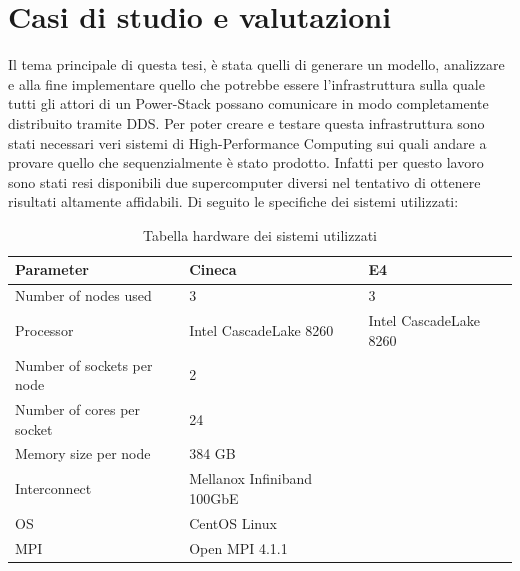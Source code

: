 \chapter{Casi di studio e valutazioni}
Il tema principale di questa tesi, è stata quelli di generare un modello, analizzare e alla fine implementare quello che potrebbe essere l'infrastruttura sulla quale tutti gli attori di un Power-Stack 
possano comunicare in modo completamente distribuito tramite DDS. Per poter creare e testare questa infrastruttura sono stati necessari veri sistemi di High-Performance Computing sui quali andare a provare quello che sequenzialmente è stato prodotto. Infatti per questo lavoro sono stati resi disponibili due supercomputer diversi nel tentativo di ottenere risultati altamente affidabili. Di seguito le specifiche dei sistemi utilizzati:

\begin{table}[H]
\begin{center}
\begin{tabular}{l|l|l}
    \hline
    \textbf{Parameter} & \textbf{Cineca} & \textbf{E4} \\
    \hline
    Number of nodes used & 3 & 3\\
    \hline
    Processor & Intel CascadeLake 8260 & Intel CascadeLake 8260  \\
    \hline
    Number of sockets per node & 2 \\
    \hline
    Number of cores per socket & 24 \\
    \hline
    Memory size per node & 384 GB \\
    \hline
    Interconnect & Mellanox Infiniband 100GbE \\
    \hline
    OS & CentOS Linux \\ 
    \hline
    MPI & Open MPI  4.1.1 \\
    \hline
\end{tabular}
\end{center}
\caption{Tabella hardware dei sistemi utilizzati}\label{table:hpc-cineca}
\end{table}

